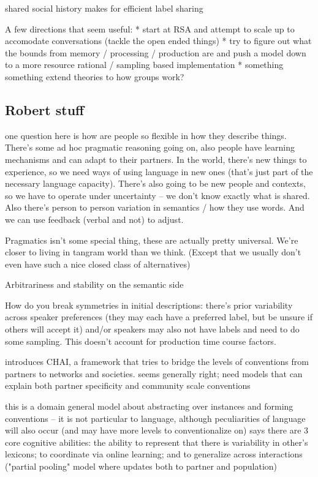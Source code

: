 \documentclass[]{article}
\begin{document}
shared social history makes for efficient label sharing 

A few directions that seem useful:
* start at RSA and attempt to scale up to accomodate conversations (tackle the open ended things)
* try to figure out what the bounds from memory / processing / production are and push a model down to a more resource rational / sampling based implementation
* something something extend theories to how groups work?

\subsection{Robert stuff} 

\cite{hawkins2020b} one question here is how are people so flexible in how they describe things. There's some ad hoc pragmatic reasoning going on, also people have learning mechanisms and can adapt to their partners. In the world, there's new things to experience, so we need ways of using language in new ones (that's just part of the necessary language capacity). There's also going to be new people and contexts, so we have to operate under uncertainty -- we don't know exactly what is shared. Also there's person to person variation in semantics / how they use words. And we can use feedback (verbal and not) to adjust. 

Pragmatics isn't some special thing, these are actually pretty universal. We're closer to living in tangram world than we think. (Except that we usually don't even have such a nice closed class of alternatives) 

Arbitrariness and stability on the semantic side 

\cite{hawkins2020b} How do you break symmetries in initial descriptions: there's prior variability across speaker preferences (they may each have a preferred label, but be unsure if others will accept it) and/or speakers may also not have labels and need to do some sampling. This doesn't account for production time course factors. 

\cite{hawkins2021} introduces CHAI, a framework that tries to bridge the levels of conventions from partners to networks and societies. seems generally right; need models that can explain both partner specificity and community scale conventions

this is a domain general model about abstracting over instances and forming conventions -- it is not particular to language, although peculiarities of language will also occur (and may have more levels to conventionalize on) 
\cite{hawkins2021} says there are 3 core cognitive abilities: the ability to represent that there is variability in other's lexicons; to coordinate via online learning; and to generalize across interactions ("partial pooling" model where updates both to partner and population) 
\end{document}
